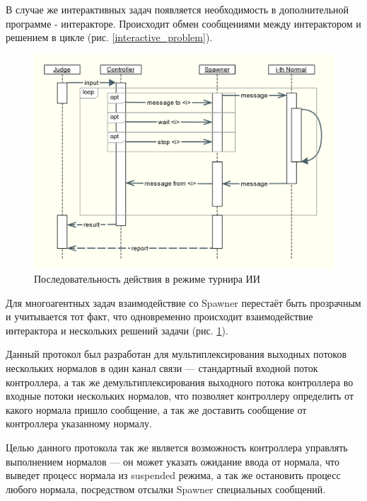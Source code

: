 \documentclass{imcs}
\begin{document}
\FloatBarrier

В случае же интерактивных задач появляется необходимость в дополнительной программе - интеракторе. Происходит обмен сообщениями между интерактором и решением в цикле (рис. \ref{interactive_problem}).

\FloatBarrier

\begin{figure}[htb]
\centering
\includegraphics[width=\textwidth,keepaspectratio]{./img/ai_contest_problem.png}
\caption{Последовательность действия в режиме турнира ИИ}
\label{ai_contest_problem}
\end{figure}

\FloatBarrier

Для многоагентных задач взаимодействие со Spawner перестаёт быть прозрачным и учитывается тот факт, что одновременно происходит взаимодействие интерактора и нескольких решений задачи (рис. \ref{ai_contest_problem}).

\FloatBarrier

Данный протокол был разработан для мультиплексирования выходных потоков нескольких нормалов в один канал связи — стандартный входной поток контроллера, а так же демультиплексирования выходного потока контроллера во входные потоки нескольких нормалов, что позволяет контроллеру определить от какого нормала пришло сообщение, а так же доставить сообщение от контроллера указанному нормалу.

Целью данного протокола так же является возможность контроллера управлять выполнением нормалов — он может указать ожидание ввода от нормала, что выведет процесс нормала из suspended режима, а так же остановить процесс любого нормала, посредством отсылки Spawner специальных сообщений.
\end{document}
